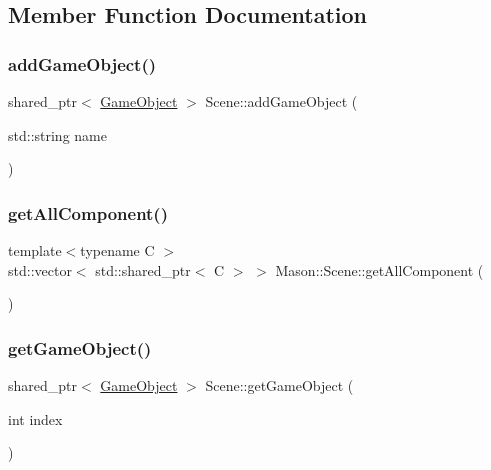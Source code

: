 \subsection{Member Function Documentation}
\hypertarget{class_mason_1_1_scene_afe8ac9cb371c04a0587faf06bf828ac9}{}\label{class_mason_1_1_scene_afe8ac9cb371c04a0587faf06bf828ac9} 
\subsubsection{\texorpdfstring{add\+Game\+Object()}{addGameObject()}}
{\footnotesize\ttfamily shared\+\_\+ptr$<$ \hyperlink{class_mason_1_1_game_object}{Game\+Object} $>$ Scene\+::add\+Game\+Object (\begin{DoxyParamCaption}\item[{std\+::string}]{name }\end{DoxyParamCaption})}

\hypertarget{class_mason_1_1_scene_a0766a39a27d936b12a93cb3f49ee32b0}{}\label{class_mason_1_1_scene_a0766a39a27d936b12a93cb3f49ee32b0} 
\subsubsection{\texorpdfstring{get\+All\+Component()}{getAllComponent()}}
{\footnotesize\ttfamily template$<$typename C $>$ \\
std\+::vector$<$ std\+::shared\+\_\+ptr$<$ C $>$ $>$ Mason\+::\+Scene\+::get\+All\+Component (\begin{DoxyParamCaption}{ }\end{DoxyParamCaption})}

\hypertarget{class_mason_1_1_scene_ae13738888d4f00135fb827639f87239b}{}\label{class_mason_1_1_scene_ae13738888d4f00135fb827639f87239b} 
\subsubsection{\texorpdfstring{get\+Game\+Object()}{getGameObject()}}
{\footnotesize\ttfamily shared\+\_\+ptr$<$ \hyperlink{class_mason_1_1_game_object}{Game\+Object} $>$ Scene\+::get\+Game\+Object (\begin{DoxyParamCaption}\item[{int}]{index }\end{DoxyParamCaption})}

